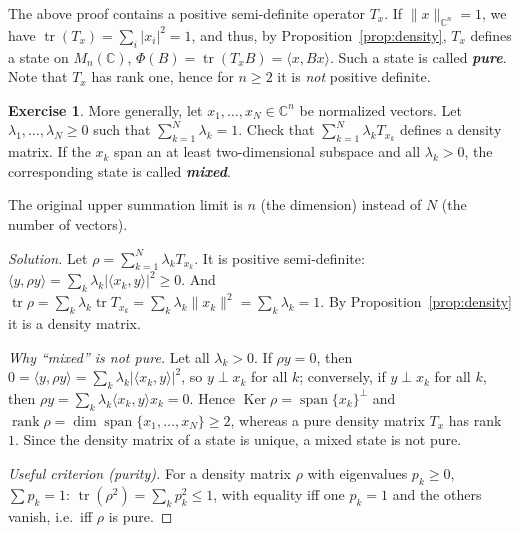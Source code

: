 \documentclass[11pt,a4paper]{article}
\numberwithin{equation}{section}
\newcommand{\C}{\mathbb{C}}
\newcommand{\ip}[2]{\langle #1, #2\rangle}
\DeclareMathOperator{\tr}{tr}
\DeclareMathOperator{\spn}{span}
\DeclareMathOperator{\rank}{rank}
\DeclareMathOperator{\Ker}{Ker}
\theoremstyle{plain}
\theoremstyle{definition}
\newtheorem{exercise}[theorem]{Exercise}
\theoremstyle{plain}
\theoremstyle{definition}
\newenvironment{solution}{\begin{proof}[Solution]}{\end{proof}}
\begin{document}
The above proof contains a positive semi-definite operator $T_x$. If $\|x\|_{\C^n}=1$, we
have $\tr(T_x)=\sum_i|x_i|^2=1$, and thus, by Proposition~\ref{prop:density}, $T_x$ defines a
state on $M_n(\C)$, $\Phi(B)=\tr(T_xB)=\ip{x}{Bx}$. Such a state is called \textbf{\emph{pure}}.
Note that $T_x$ has rank one, hence for $n\ge2$ it is \emph{not} positive definite.

\begin{exercise}\label{exo:mixed}
More generally, let $x_1,\dots,x_N\in\C^n$ be normalized vectors. Let
$\lambda_1,\dots,\lambda_N\geqslant0$ such that $\sum_{k=1}^N\lambda_k=1$. Check that
$\sum_{k=1}^N\lambda_kT_{x_k}$ defines a density matrix. If the $x_k$ span an at least
two-dimensional subspace and all $\lambda_k>0$, the corresponding state is called
\textbf{\emph{mixed}}.
\end{exercise}
\begin{correction}[(Ex.~6.4)]
The original upper summation limit is $n$ (the dimension) instead of $N$ (the number of vectors).
\end{correction}
\begin{solution}
Let $\rho=\sum_{k=1}^N\lambda_kT_{x_k}$. It is positive semi-definite:
$\ip{y}{\rho y}=\sum_k\lambda_k|\ip{x_k}{y}|^2\ge0$. And
$\tr\rho=\sum_k\lambda_k\tr T_{x_k}=\sum_k\lambda_k\|x_k\|^2=\sum_k\lambda_k=1$. By
Proposition~\ref{prop:density} it is a density matrix.

\emph{Why ``mixed'' is not pure.} Let all $\lambda_k>0$. If $\rho y=0$, then
$0=\ip{y}{\rho y}=\sum_k\lambda_k|\ip{x_k}{y}|^2$, so $y\perp x_k$ for all $k$; conversely,
if $y\perp x_k$ for all $k$, then $\rho y=\sum_k\lambda_k\ip{x_k}{y}x_k=0$. Hence
$\Ker\rho=\spn\{x_k\}^\perp$ and $\rank\rho=\dim\spn\{x_1,\dots,x_N\}\ge2$, whereas a pure
density matrix $T_x$ has rank $1$. Since the density matrix of a state is unique, a mixed
state is not pure.

\emph{Useful criterion (purity).} For a density matrix $\rho$ with eigenvalues
$p_k\ge0$, $\sum p_k=1$: $\tr(\rho^2)=\sum_kp_k^2\le1$, with equality iff one $p_k=1$ and
the others vanish, i.e.\ iff $\rho$ is pure.
\end{solution}
\end{document}
